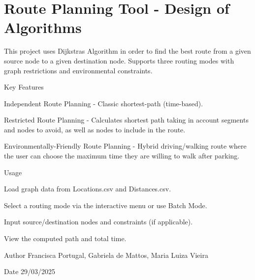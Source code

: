 \chapter{Route Planning Tool -\/ Design of Algorithms}
\hypertarget{index}{}\label{index}
This project uses Dijkstra\textquotesingle{}s Algorithm in order to find the best route from a given source node to a given destination node. Supports three routing modes with graph restrictions and environmental constraints.

Key Features
\begin{DoxyEnumerate}
\item Independent Route Planning -\/ Classic shortest-\/path (time-\/based).
\item Restricted Route Planning -\/ Calculates shortest path taking in account segments and nodes to avoid, as well as nodes to include in the route.
\item Environmentally-\/\+Friendly Route Planning -\/ Hybrid driving/walking route where the user can choose the maximum time they are willing to walk after parking.
\end{DoxyEnumerate}

Usage
\begin{DoxyEnumerate}
\item Load graph data from {\ttfamily Locations.\+csv} and {\ttfamily Distances.\+csv}.
\item Select a routing mode via the interactive menu or use Batch Mode.
\item Input source/destination nodes and constraints (if applicable).
\item View the computed path and total time.
\end{DoxyEnumerate}

\begin{DoxyAuthor}{Author}
Francisca Portugal, Gabriela de Mattos, Maria Luiza Vieira 
\end{DoxyAuthor}
\begin{DoxyDate}{Date}
29/03/2025 
\end{DoxyDate}
